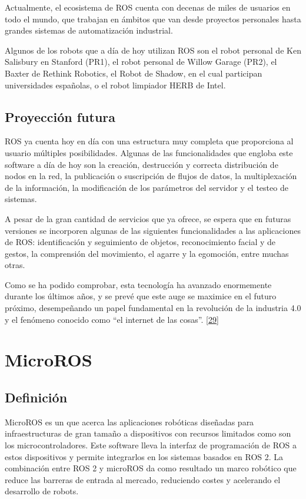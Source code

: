 \documentclass[a4paper,11pt,spanish]{sphinxmanual}
\begin{document}
\sphinxAtStartPar
Actualmente, el ecosistema de ROS cuenta con decenas de miles de usuarios
en todo el mundo, que trabajan en ámbitos que van desde proyectos
personales hasta grandes sistemas de automatización industrial.

\sphinxAtStartPar
Algunos de los robots que a día de hoy utilizan ROS son el robot
personal de Ken Salisbury en Stanford (PR1), el robot personal de Willow
Garage (PR2), el Baxter de Rethink Robotics, el Robot de Shadow, en el
cual participan universidades españolas, o el robot limpiador HERB de
Intel.


\subsection{Proyección futura}
\label{\detokenize{marco_teorico_y_estado_del_arte:proyeccion-futura}}
\sphinxAtStartPar
ROS ya cuenta hoy en día con una estructura
muy completa que proporciona al usuario múltiples posibilidades. Algunas
de las funcionalidades que engloba este software a día de hoy son la
creación, destrucción y correcta distribución de nodos en la red, la
publicación o suscripción de flujos de datos, la multiplexación de la
información, la modificación de los parámetros del servidor y el testeo
de sistemas.

\sphinxAtStartPar
A pesar de la gran cantidad de servicios que ya ofrece, se espera que en
futuras versiones se incorporen algunas de las siguientes
funcionalidades a las aplicaciones de ROS: identificación y seguimiento
de objetos, reconocimiento facial y de gestos, la comprensión del
movimiento, el agarre y la egomoción, entre muchas otras.

\sphinxAtStartPar
Como se ha podido comprobar, esta tecnología ha avanzado enormemente
durante los últimos años, y se prevé que este auge se maximice en el futuro próximo,
desempeñando un papel fundamental en la revolución de la
industria 4.0 y el fenómeno conocido como “el internet de las cosas”.
{[}\hyperlink{cite.marco_teorico_y_estado_del_arte:id13}{29}{]}

\sphinxAtStartPar



\section{Micro\sphinxhyphen{}ROS}
\label{\detokenize{marco_teorico_y_estado_del_arte:micro-ros}}

\subsection{Definición}
\label{\detokenize{marco_teorico_y_estado_del_arte:id49}}
\sphinxAtStartPar
Micro\sphinxhyphen{}ROS es un  que acerca las aplicaciones robóticas
diseñadas para infraestructuras de gran tamaño a dispositivos con
recursos limitados como son los microcontroladores. Este software lleva
la interfaz de programación de ROS a estos dispositivos y permite
integrarlos en los sistemas basados en ROS 2. La combinación entre ROS 2
y micro\sphinxhyphen{}ROS da como resultado un marco robótico que reduce las barreras
de entrada al mercado, reduciendo costes y acelerando el desarrollo de
robots.
\end{document}
